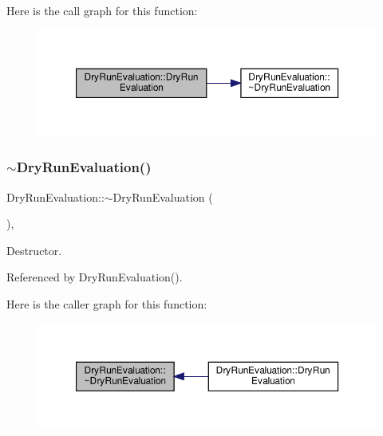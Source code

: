 Here is the call graph for this function\+:
\nopagebreak
\begin{figure}[H]
\begin{center}
\leavevmode
\includegraphics[width=350pt]{dd/dd9/classDryRunEvaluation_ac9aa5c40633fb63835bf19e5e10b74bc_cgraph}
\end{center}
\end{figure}
\mbox{\label{classDryRunEvaluation_af96f8b630ad53101c5ec8d67944e55c9}} 
\subsubsection{\texorpdfstring{$\sim$\+Dry\+Run\+Evaluation()}{~DryRunEvaluation()}}
{\footnotesize\ttfamily Dry\+Run\+Evaluation\+::$\sim$\+Dry\+Run\+Evaluation (\begin{DoxyParamCaption}{ }\end{DoxyParamCaption})\hspace{0.3cm}{\ttfamily [override]}, {\ttfamily [default]}}



Destructor. 



Referenced by Dry\+Run\+Evaluation().

Here is the caller graph for this function\+:
\nopagebreak
\begin{figure}[H]
\begin{center}
\leavevmode
\includegraphics[width=350pt]{dd/dd9/classDryRunEvaluation_af96f8b630ad53101c5ec8d67944e55c9_icgraph}
\end{center}
\end{figure}


